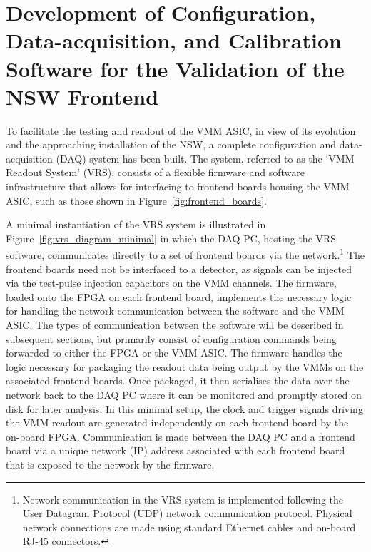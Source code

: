 \section{Development of Configuration, Data-acquisition, and Calibration Software for the Validation of the NSW Frontend}
\label{sec:nsw_vrs}

To facilitate the testing and readout of the VMM ASIC, in view of its evolution
and the approaching installation of the NSW, a complete
configuration and data-acquisition (DAQ) system has been built.
The system, referred to as the `VMM Readout System' (VRS), consists of a flexible
firmware and software infrastructure that allows for
interfacing to frontend boards housing the VMM ASIC, such as those
shown in Figure~\ref{fig:frontend_boards}.

A minimal instantiation of the VRS system is illustrated in Figure~\ref{fig:vrs_diagram_minimal}
in which the DAQ PC, hosting the VRS software, communicates directly to a set
of frontend boards via the network.\footnote{Network communication in the VRS system is implemented following the User Datagram Protocol (UDP) network
communication protocol. Physical network connections are made using standard Ethernet cables and on-board RJ-45 connectors.}
The frontend boards need not be interfaced to a detector, as signals can be injected via
the test-pulse injection capacitors on the VMM channels.
The firmware, loaded onto the FPGA on each frontend board, implements the necessary logic for handling the network communication
between the software and the VMM ASIC.
The types of communication between the software will be described in subsequent sections, but primarily consist of configuration
commands being forwarded to either the FPGA or the VMM ASIC.
The firmware handles the logic necessary for packaging the readout data being
output by the VMMs on the associated frontend boards.
Once packaged, it then serialises the data over the network back to the DAQ PC where it can be monitored
and promptly stored on disk for later analysis.
In this minimal setup, the clock and trigger signals driving the VMM readout are generated independently
on each frontend board by the on-board FPGA.
Communication is made between the DAQ PC and a frontend board via a unique network (IP)
address associated with each frontend board that is exposed to the network by the firmware. 

